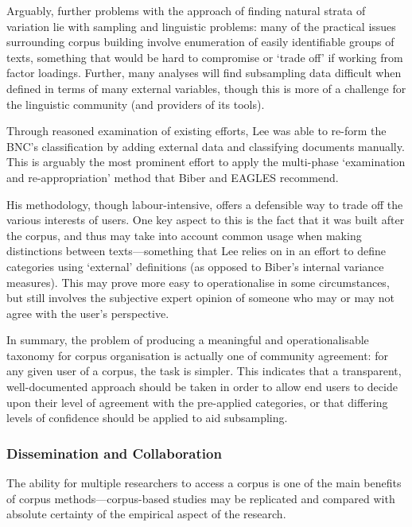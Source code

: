 Arguably, further problems with the approach of finding natural strata of variation lie with sampling and linguistic problems: many of the practical issues surrounding corpus building involve enumeration of easily identifiable groups of texts, something that would be hard to compromise or `trade off' if working from factor loadings.  Further, many analyses will find subsampling data difficult when defined in terms of many external variables\cite{aston2001text}, though this is more of a challenge for the linguistic community (and providers of its tools).


Through reasoned examination of existing efforts, Lee\cite{lee2003bnc}
was able to re-form the BNC's classification by adding external data and classifying documents manually.  This is arguably the most prominent effort to apply the multi-phase `examination and re-appropriation' method that Biber and EAGLES recommend.

His methodology, though labour-intensive, offers a defensible way to trade off the various interests of users.  One key aspect to this is the fact that it was built after the corpus, and thus may take into account common usage when making distinctions between texts---something that Lee relies on in an effort to define categories using `external' definitions (as opposed to Biber's internal variance measures).  This may prove more easy to operationalise in some circumstances, but still involves the subjective expert opinion of someone who may or may not agree with the user's perspective\cite{aston2001text}.


In summary, the problem of producing a meaningful and operationalisable taxonomy for corpus organisation is actually one of community agreement: for any given user of a corpus, the task is simpler.  This indicates that a transparent, well-documented approach should be taken in order to allow end users to decide upon their level of agreement with the pre-applied categories, or that differing levels of confidence should be applied to aid subsampling.








\subsubsection{Dissemination and Collaboration}
The ability for multiple researchers to access a corpus is one of the main benefits of corpus methods---corpus-based studies may be replicated and compared with absolute certainty of the empirical aspect of the research.

